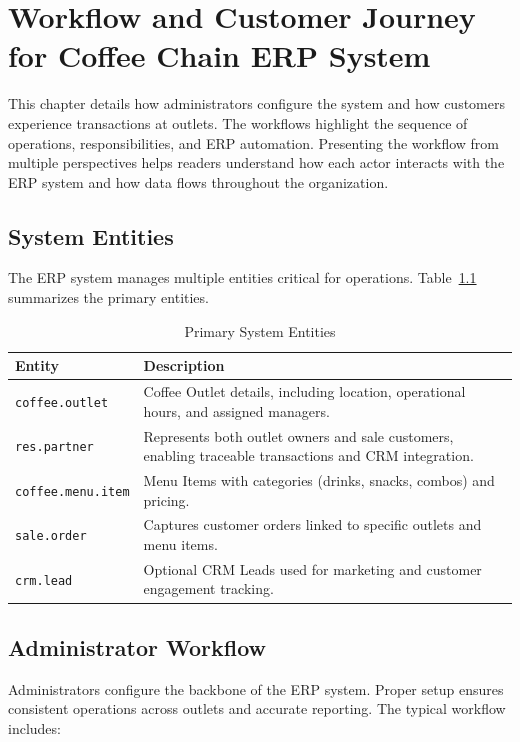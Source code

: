 \chapter{Workflow and Customer Journey for Coffee Chain ERP System}

This chapter details how administrators configure the system and how customers experience transactions at outlets. The workflows highlight the sequence of operations, responsibilities, and ERP automation. Presenting the workflow from multiple perspectives helps readers understand how each actor interacts with the ERP system and how data flows throughout the organization.

\section*{System Entities}
The ERP system manages multiple entities critical for operations. Table~\ref{tab:entities} summarizes the primary entities.

\begin{table}[H]
\centering
\begin{tabular}{|l|p{10cm}|}
\hline
\textbf{Entity} & \textbf{Description} \\ \hline
\texttt{coffee.outlet} & Coffee Outlet details, including location, operational hours, and assigned managers. \\ \hline
\texttt{res.partner} & Represents both outlet owners and sale customers, enabling traceable transactions and CRM integration. \\ \hline
\texttt{coffee.menu.item} & Menu Items with categories (drinks, snacks, combos) and pricing. \\ \hline
\texttt{sale.order} & Captures customer orders linked to specific outlets and menu items. \\ \hline
\texttt{crm.lead} & Optional CRM Leads used for marketing and customer engagement tracking. \\ \hline
\end{tabular}
\caption{Primary System Entities}
\label{tab:entities}
\end{table}

\section*{Administrator Workflow}
Administrators configure the backbone of the ERP system. Proper setup ensures consistent operations across outlets and accurate reporting. The typical workflow includes:

